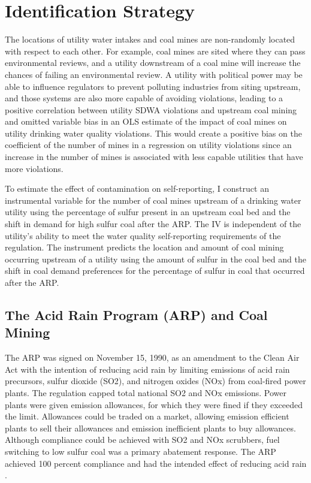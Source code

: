 \documentclass[12pt]{article}
\begin{document}



\section{Identification Strategy}

The locations of utility water intakes and coal mines are non-randomly located with respect to each other. For example, coal mines are sited where they can pass environmental reviews, and a utility downstream of a coal mine will increase the chances of failing an environmental review. A utility with political power may be able to influence regulators to prevent polluting industries from siting upstream, and those systems are also more capable of avoiding violations, leading to a positive correlation between utility SDWA violations and upstream coal mining and omitted variable bias in an OLS estimate of the impact of coal mines on utility drinking water quality violations. This would create a positive bias on the coefficient of the number of mines in a regression on utility violations since an increase in the number of mines is associated with less capable utilities that have more violations.

To estimate the effect of contamination on self-reporting, I construct an instrumental variable for the number of coal mines upstream of a drinking water utility using the percentage of sulfur present in an upstream coal bed and the shift in demand for high sulfur coal after the ARP. The IV is independent of the utility's ability to meet the water quality self-reporting requirements of the regulation. The instrument predicts the location and amount of coal mining occurring upstream of a utility using the amount of sulfur in the coal bed and the shift in coal demand preferences for the percentage of sulfur in coal that occurred after the ARP.

\subsection{The Acid Rain Program (ARP) and Coal Mining}

The ARP was signed on November 15, 1990, as an amendment to the Clean Air Act with the intention of reducing acid rain by limiting emissions of acid rain precursors, sulfur dioxide (SO2), and nitrogen oxides (NOx) from coal-fired power plants. The regulation capped total national SO2 and NOx emissions. Power plants were given emission allowances, for which they were fined if they exceeded the limit. Allowances could be traded on a market, allowing emission efficient plants to sell their allowances and emission inefficient plants to buy allowances. Although compliance could be achieved with SO2 and NOx scrubbers, fuel switching to low sulfur coal was a primary abatement response. The ARP achieved 100 percent compliance and had the intended effect of reducing acid rain \parencite{lattanzio2022clean}. 
\end{document}
